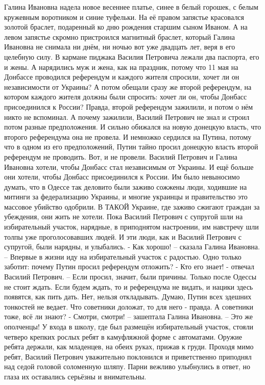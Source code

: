 Галина Ивановна надела новое весеннее платье, синее в белый горошек, с белым кружевным воротником и синие туфельки. На её правом запястье красовался золотой браслет, подаренный ко дню рождения старшим сыном Иваном. А на левом запястье скромно пристроился магнитный браслет, который Галина Ивановна не снимала ни днём, ни ночью вот уже двадцать лет, веря в его целебную силу.
В кармане пиджака Василия Петровича лежали два паспорта, его и жены. А нарядились муж и жена, как на праздник, потому что 11 мая на Донбассе проводился референдум и каждого жителя спросили, хочет ли он независимости от Украины? А потом обещали сразу же второй референдум, на котором каждого жителя должны были спросить: хочет ли он, чтобы Донбасс присоединился к России?
Правда, второй референдум зажилили, и потом о нём никто не вспоминал. А почему зажилили, Василий Петрович не знал и строил потом разные предположения. И сильно обижался на новую донецкую власть, что второго референдума она не провела. И немножко сердился на Путина, потому что в одном из его предположений, Путин тайно просил донецкую власть второй референдум не проводить. Вот, и не провели.
Василий Петрович и Галина Ивановна хотели, чтобы Донбасс стал независимым от Украины. И ещё больше они хотели, чтобы Донбасс присоединился к России. Им было невыносимо думать, что в Одессе так деловито были заживо сожжены люди, ходившие на митинги за федерализацию Украины, и многие украинцы и правительство это массовое убийство одобрили. В ТАКОЙ Украине, где заживо сжигают граждан за убеждения, они жить не хотели.
Пока Василий Петрович с супругой шли на избирательный участок, нарядные, в приподнятом настроении, им навстречу шли толпы уже проголосовавших людей. И эти люди, как и Василий Петрович с супругой, были нарядны, и улыбались.
- Как хорошо! – сказала Галина Ивановна. – Впервые в жизни иду на избирательный участок с радостью. Одно только заботит: почему Путин просил референдум отложить?
- Кто его знает! - отвечал Василий Петрович. – Если просил, значит, были причины. Только после Одессы не стоит ждать. Если будем ждать, то и референдума не видать, и нацики здесь появятся, как пить дать. Нет, нельзя откладывать. Думаю, Путин всех здешних тонкостей не ведает. Что советники доложат, то для него - правда. А советники тоже, всё ли знают?
- Смотри, смотри! – зашептала Галина Ивановна. – Это же ополченцы! У входа в школу, где был размещён избирательный участок, стояли четверо крепких рослых ребят в камуфляжной форме с автоматами. Оружие ребята держали, как младенцев, на обеих руках, прижав к груди.
Проходя мимо ребят, Василий Петрович уважительно поклонился и приветственно приподнял над седой головой соломенную шляпу. Парни вежливо улыбнулись в ответ, но глаза их оставались серьёзны и внимательны.

